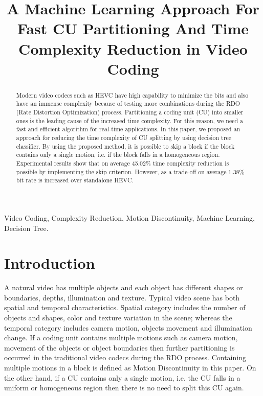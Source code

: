 \documentclass{article}
\begin{document}
\sloppy

\def\x{{\mathbf x}}
\def\L{{\cal L}}


\title{A Machine Learning Approach For Fast CU Partitioning And Time Complexity Reduction in Video Coding}


\address{$^{\#}$Rajshahi University of Engineering \& Technology, Rajshahi,  Bangladesh}

\maketitle


\begin{abstract}

Modern video codecs such as HEVC have high capability to minimize the bits and also have an immense complexity because of testing more combinations during the RDO (Rate Distortion Optimization) process. Partitioning a coding unit (CU) into smaller ones is the leading cause of the increased time complexity. For this reason, we need a fast and efficient algorithm for real-time applications. In this paper, we proposed an approach for reducing the time complexity of CU splitting by using decision tree classifier. By using the proposed method, it is possible to skip a block if the block contains only a single motion, i.e. if the block falls in a homogeneous region. Experimental results show that on average 45.02\% time complexity reduction is possible by implementing the skip criterion. However, as a trade-off on average 1.38\% bit rate is increased over standalone HEVC.

\end{abstract}

\begin{keywords}
 Video Coding, Complexity Reduction, Motion Discontinuity, Machine Learning, Decision Tree.
\end{keywords}


\section{Introduction}
\label{sec:Introduction}


A natural video has multiple objects and each object has different shapes or boundaries, depths, illumination and texture. Typical video scene has both spatial and temporal characteristics. Spatial category includes the number of objects and shapes, color and texture variation in the scene; whereas the temporal category includes camera motion, objects movement and illumination change. If a coding unit contains multiple motions such as camera motion, movement of the objects or object boundaries then further partitioning is occurred in the traditional video codecs during the RDO process. Containing multiple motions in a block is defined as Motion Discontinuity in this paper. On the other hand, if a CU contains only a single motion, i.e. the CU falls in a uniform or homogeneous region then there is no need to split this CU again. \\
\end{document}
